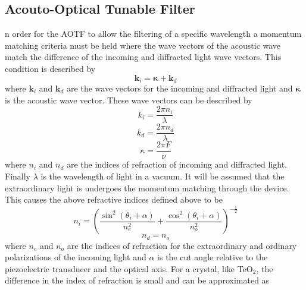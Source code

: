 \documentclass[12pt, draft]{article}
\begin{document}
\subsection{Acouto-Optical Tunable Filter}

n order for the AOTF to allow the filtering of a specific wavelength a momentum matching criteria must be held where the wave vectors of the acoustic wave match the difference of the incoming and diffracted light wave vectors. This condition is described by
\begin{equation}
    \ \mathbf{k}_{i} = \boldsymbol\kappa + \mathbf{k}_{d}
    \label{eqn:3.1:phaseMatching}
\end{equation}
where $\mathbf{k}_{i}$ and $\mathbf{k}_{d}$ are the wave vectors for the incoming and diffracted light and $\boldsymbol\kappa$ is the acoustic wave vector. These wave vectors can be described by
\begin{equation}
    \ k_{i} = \frac{2\pi n_{i}}{\lambda}
    \label{eqn:3.1:incomingWavevector}
\end{equation}
\begin{equation}
    \ k_{d} = \frac{2\pi n_{d}}{\lambda}
    \label{eqn:3.1:diffractedWavevector}
\end{equation}
\begin{equation}
    \ \kappa = \frac{2\pi F}{\nu}
    \label{eqn:3.1:acousticWavevector}
\end{equation}
where $n_{i}$ and $n_{d}$ are the indices of refraction of incoming and diffracted light. Finally $\lambda$ is the wavelength of light in a vacuum. It will be assumed that the extraordinary light is undergoes the momentum matching through the device. This causes the above refractive indices defined above to be
\begin{equation}
    \ n_{i} = \left( \frac{\sin^{2}(\theta_{i}+\alpha)}{n_{e}^{2}} + \frac{\cos^{2}(\theta_{i}+\alpha)}{n_{o}^{2}} \right)^{-\frac{1}{2}}
    \label{eqn:3.1:incomingIndexOfRefraction}
\end{equation}
\begin{equation}
    \ n_{d} = n_{o}
    \label{eqn:3.1:diffractedIndexOfRefraction}
\end{equation}
where $n_{e}$ and $n_{o}$ are the indices of refraction for the extraordinary and ordinary polarizations of the incoming light and $\alpha$ is the cut angle relative to the piezoelectric transducer and the optical axis. For a crystal, like TeO$_{2}$, the difference in the index of refraction is small and can be approximated as \citep{Voloshinov2007}
\end{document}
